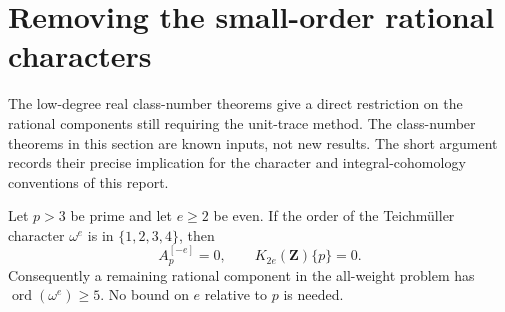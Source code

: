 \section{Removing the small-order rational characters}
\label{sec:kt-small-character-order}

The low-degree real class-number theorems give a direct restriction
on the rational components still requiring the unit-trace method.
The class-number theorems in this section are known inputs, not new
results. The short argument records their precise implication for
the character and integral-cohomology conventions of this report.

\begin{proposition}
Let $p>3$ be prime and let $e\ge2$ be even. If the order of the
Teichm\"uller character $\omega^e$ is in $\{1,2,3,4\}$, then
\[
                 A_p^{[-e]}=0,
                 \qquad K_{2e}(\mathbf Z)\{p\}=0.       \tag{LO.1}
\]
Consequently a remaining rational component in the all-weight
problem has $\operatorname{ord}(\omega^e)\ge5$.
No bound on $e$ relative to $p$ is needed.
\end{proposition}

